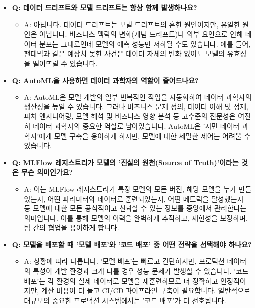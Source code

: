 \documentclass[11pt,a4paper]{article}
\theoremstyle{definition}
\begin{document}
\begin{itemize}
    \item \textbf{Q: 데이터 드리프트와 모델 드리프트는 항상 함께 발생하나요?}
    \begin{itemize}
        \item A: 아닙니다. 데이터 드리프트는 모델 드리프트의 흔한 원인이지만, 유일한 원인은 아닙니다. 비즈니스 맥락의 변화(개념 드리프트)나 외부 요인으로 인해 데이터 분포는 그대로인데 모델의 예측 성능만 저하될 수도 있습니다. 예를 들어, 팬데믹과 같은 예상치 못한 사건은 데이터 자체의 변화 없이도 모델의 유효성을 떨어뜨릴 수 있습니다.
    \end{itemize}

    \item \textbf{Q: AutoML을 사용하면 데이터 과학자의 역할이 줄어드나요?}
    \begin{itemize}
        \item A: AutoML은 모델 개발의 일부 반복적인 작업을 자동화하여 데이터 과학자의 생산성을 높일 수 있습니다. 그러나 비즈니스 문제 정의, 데이터 이해 및 정제, 피처 엔지니어링, 모델 해석 및 비즈니스 영향 분석 등 고수준의 전문성은 여전히 데이터 과학자의 중요한 역할로 남아있습니다. AutoML은 '시민 데이터 과학자'에게 모델 구축을 용이하게 하지만, 모델에 대한 세밀한 제어는 어려울 수 있습니다.
    \end{itemize}

    \item \textbf{Q: MLFlow 레지스트리가 모델의 '진실의 원천(Source of Truth)'이라는 것은 무슨 의미인가요?}
    \begin{itemize}
        \item A: 이는 MLFlow 레지스트리가 특정 모델의 모든 버전, 해당 모델을 누가 만들었는지, 어떤 파라미터와 데이터로 훈련되었는지, 어떤 메트릭을 달성했는지 등 모델에 대한 모든 공식적이고 신뢰할 수 있는 정보를 중앙에서 관리한다는 의미입니다. 이를 통해 모델의 이력을 완벽하게 추적하고, 재현성을 보장하며, 팀 간의 협업을 용이하게 합니다.
    \end{itemize}

    \item \textbf{Q: 모델을 배포할 때 '모델 배포'와 '코드 배포' 중 어떤 전략을 선택해야 하나요?}
    \begin{itemize}
        \item A: 상황에 따라 다릅니다. '모델 배포'는 빠르고 간단하지만, 프로덕션 데이터의 특성이 개발 환경과 크게 다를 경우 성능 문제가 발생할 수 있습니다. '코드 배포'는 각 환경의 실제 데이터로 모델을 재훈련하므로 더 정확하고 안정적이지만, 계산 비용이 더 들고 CI/CD 파이프라인 구축이 필요합니다. 일반적으로 대규모의 중요한 프로덕션 시스템에서는 '코드 배포'가 더 선호됩니다.
    \end{itemize}


\end{itemize}
\end{document}
